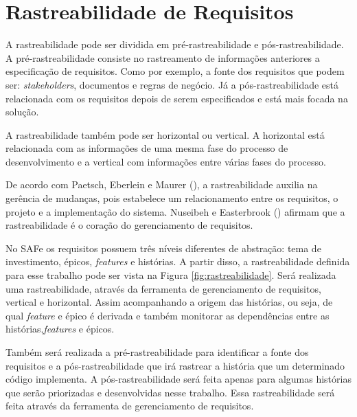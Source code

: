 \section[Rastreabilidade de Requisitos]{Rastreabilidade de Requisitos}

A rastreabilidade pode ser dividida em pré-rastreabilidade e pós-rastreabilidade. 
A pré-rastreabilidade consiste no rastreamento de informações anteriores a especificação
de requisitos. Como por exemplo, a fonte dos requisitos que podem ser: \textit{stakeholders},
documentos e regras de negócio. Já a pós-rastreabilidade está relacionada com os requisitos depois 
de serem especificados e está mais focada na solução. \cite{persson}

A rastreabilidade também pode ser horizontal ou vertical. A horizontal está relacionada com
as informações de uma mesma fase do processo de desenvolvimento e a vertical
com informações entre várias fases do processo. \cite{persson}

De acordo com Paetsch, Eberlein e Maurer (\citeyear{paetsch}), a rastreabilidade auxilia na gerência de mudanças, 
pois estabelece um relacionamento entre os requisitos, o projeto e a implementação do sistema. Nuseibeh e Easterbrook (\citeyear{nuseibeh})
afirmam que a rastreabilidade é o coração do gerenciamento de requisitos.

No SAFe os requisitos possuem três níveis diferentes de abstração: tema de investimento, épicos, \textit{features} e histórias.
A partir disso, a rastreabilidade definida para esse trabalho pode ser vista na Figura \ref{fig:rastreabilidade}.
Será realizada uma rastreabilidade, através da ferramenta de gerenciamento de requisitos, vertical e horizontal. Assim acompanhando
a origem das histórias, ou seja, de qual \textit{feature} e épico é derivada e também monitorar as dependências entre as histórias,\textit{features} e épicos.

Também será realizada a pré-rastreabilidade para identificar a fonte dos requisitos e a pós-rastreabilidade que irá rastrear a história que um determinado
código implementa. A pós-rastreabilidade será feita apenas para algumas histórias que serão priorizadas e desenvolvidas nesse trabalho.
Essa rastreabilidade será feita através da ferramenta de gerenciamento de requisitos.

\graphicspath{{figuras/}}


